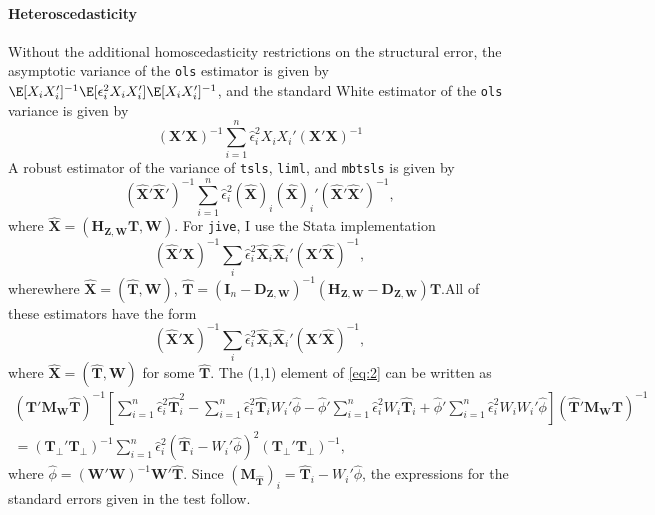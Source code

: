 \documentclass{mynotes}
\newcommand{\bx}{\mathbf{X}} %
\newcommand{\bt}{\mathbf{T}} %
\newcommand{\bz}{\mathbf{Z}} %
\newcommand{\bw}{\mathbf{W}} %
\newcommand{\eye}{\mathbf{I}} %
\newcommand{\Hm}[1]{\mathbf{H}_{#1}} %
\newcommand{\Dm}[1]{\mathbf{D}_{#1}} %
\newcommand{\Mm}[1]{\mathbf{M}_{#1}} %
\begin{document}
\begin{appendices}
\paragraph{Heteroscedasticity}
Without the additional homoscedasticity restrictions on the structural error,
the asymptotic variance of the \texttt{ols} estimator is given by
$\E[X_{i}X_{i}']^{-1}\E[\epsilon_{i}^{2}X_{i}X_{i}']\E[X_{i}X_{i}']^{-1}$, and
the standard White estimator of the \texttt{ols} variance is given by
\begin{equation*}
  (\bx'\bx)^{-1}\sum_{i=1}^{n}\hat{\epsilon}_{i}^{2}X_{i}X_{i}'   (\bx'\bx)^{-1}
\end{equation*}
A robust estimator of the variance of
\texttt{tsls}, \texttt{liml}, and \texttt{mbtsls} is given by \citep[Equation
5.34]{wooldridge02}
\begin{equation*}
  (\hat{\bx}'\hat{\bx}')^{-1}
  \sum_{i=1}^{n}\hat{\epsilon}_{i}^{2}(\hat{\bx})_{i}(\hat{\bx})_{i}'
  (\hat{\bx}'\hat{\bx}')^{-1},
\end{equation*}
where $\hat{\bx}=(\Hm{\bz,\bw}\bt,\bw)$. For \texttt{jive}, I use the Stata
implementation \citep{poi06}
\begin{equation*}
  (\hat{\bx}'\bx)^{-1}\sum_{i}\hat{\epsilon}_{i}^{2}\hat{\bx}_{i}\hat{\bx}_{i}'
  (\bx'\hat{\bx})^{-1},
\end{equation*}
wherewhere $\hat{\bx}=(\hat{\bt},\bw)$,
$\hat{\bt}=(\eye_{n}-\Dm{\bz,\bw})^{-1}(\Hm{\bz,\bw}-\Dm{\bz,\bw})\bt$.All of these estimators have the form
\begin{equation}\label{eq:2}
  (\hat{\bx}'\bx)^{-1}\sum_{i}\hat{\epsilon}_{i}^{2}\hat{\bx}_{i}\hat{\bx}_{i}'
  (\bx'\hat{\bx})^{-1},
\end{equation}
where $\hat{\bx}=(\hat{\bt},\bw)$ for some $\hat{\bt}$. The (1,1) element of
\eqref{eq:2} can be written as
\begin{multline*}
  (\bt'\Mm{\bw}\hat{\bt})^{-1}
  \left[\sum_{i=1}^{n}\hat{\epsilon}_{i}^{2}\hat{\bt}_{i}^{2} -
    \sum_{i=1}^{n}\hat{\epsilon}_{i}^{2}\hat{\bt}_{i}W_{i}'\hat{\phi}
    -\hat{\phi}' \sum_{i=1}^{n}\hat{\epsilon}_{i}^{2}W_{i}\hat{\bt}_{i}
    +\hat{\phi}' \sum_{i=1}^{n}\hat{\epsilon}_{i}^{2}W_{i}W_{i}'
    \hat{\phi}\right]  (\hat{\bt}'\Mm{\bw}\bt)^{-1}  \\
  =(\bt_{\perp}'\bt_{\perp})^{-1} \sum_{i=1}^{n}\hat{\epsilon}_{i}^{2}
  \left(\hat{\bt}_{i}-W_{i}'\hat{\phi}\right)^{2}
  (\bt_{\perp}'\bt_{\perp})^{-1},
\end{multline*}
where $\hat{\phi}=(\bw'\bw)^{-1}\bw'\hat{\bt}$. Since
$(\Mm{\hat{\bt}})_{i}=\hat{\bt}_{i}-W_{i}'\hat{\phi}$, the expressions for the
standard errors given in the test follow.
\end{appendices}

\SmallBib

\end{document}
